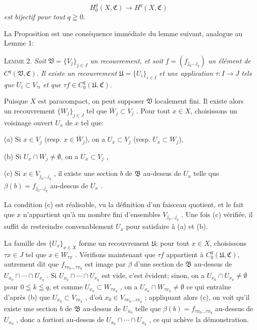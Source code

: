 \begin{equation*}
H_0^q(X, \mathfrak{C}) \longrightarrow H^q(X, \mathfrak{C})
\end{equation*}
\textit{est bijectif pour tout} $q \geqq 0$.

La Proposition est une conséquence immédiate du lemme suivant, analogue au Lemme 1:

\textsc{Lemme} 2. \textit{Soit} $\mathfrak{V} = \{V_j\}_{j \in J}$ \textit{un recouvrement, et soit} $f = (f_{j_0 \ldots j_q})$ \textit{un élément de} $C^q(\mathfrak{V}, \mathfrak{C})$. \textit{Il existe un recouvrement} $\mathfrak{U} = \{U_i\}_{i \in I}$ \textit{et une application} $\tau: I \rightarrow J$ \textit{tels que} $U_i \subset V_{\tau i}$ \textit{et que} $\tau f \in C_0^q(\mathfrak{U}, \mathfrak{C})$.

Puisque $X$ est paracompact, on peut supposer $\mathfrak{V}$ localement fini. Il existe alors un recouvrement $\{W_j\}_{j \in J}$ tel que $\overline{W}_j \subset V_j$ . Pour tout $x \in X$, choisissons un voisinage ouvert $U_x$ de $x$ tel que:

(a) Si $x \in V_j$ (resp. $x \in \overline{W}_j$), on a $U_x \subset V_j$ (resp. $U_x \subset W_j$),

(b) Si $U_x \cap W_j \neq \emptyset$, on a $U_x \subset V_j$ ,

(c) Si $x \in V_{j_0 \ldots j_q}$ , il existe une section $b$ de $\mathfrak{B}$ au-dessus de $U_x$ telle que $\beta(b) = f_{j_0 \ldots j_q}$ au-dessus de $U_x$ .

La condition (c) est réalisable, vu la définition d'un faisceau quotient, et le fait que $x$ n'appartient qu'à un nombre fini d'ensembles $V_{j_0 \ldots j_q}$ . Une fois (c) vérifiée, il suffit de restreindre convenablement $U_x$ pour satisfaire à (a) et (b).

La famille des $\{U_x\}_{x \in X}$ forme un recouvrement $\mathfrak{U}$; pour tout $x \in X$, choisissons $\tau x \in J$ tel que $x \in W_{\tau x}$ . Vérifions maintenant que $\tau f$ appartient à $C_0^q(\mathfrak{U}, \mathfrak{C})$, autrement dit que $f_{\tau x_0 \ldots \tau x_q}$ est image par $\beta$ d'une section de $\mathfrak{B}$ au-dessus de $U_{x_0} \cap \cdots \cap U_{x_q}$ . Si $U_{x_0} \cap \cdots \cap U_{x_q}$ est vide, c'est évident; sinon, on a $U_{x_0} \cap U_{x_k} \neq \emptyset$ pour $0 \leqq k \leqq q$, et comme $U_{x_k} \subset W_{\tau x_k}$ , on a $U_{x_0} \cap W_{\tau x_k} \neq \emptyset$ ce qui entraîne d'après (b) que $U_{x_0} \subset V_{\tau x_k}$ , d'où $x_0 \in V_{\tau x_0 \ldots \tau x_q}$ ; appliquant alors (c), on voit qu'il existe une section $b$ de $\mathfrak{B}$ au-dessus de $U_{x_0}$ telle que $\beta(b) = f_{\tau x_0 \ldots \tau x_q}$ au-dessus de $U_{x_0}$ , donc a fortiori au-dessus de $U_{x_0} \cap \cdots \cap U_{x_q}$ , ce qui achève la démonstration.


